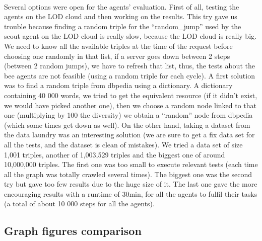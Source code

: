 \documentclass{article}
\begin{document}
		\paragraph{}
			Several options were open for the agents' evaluation.
			First of all, testing the agents on the LOD cloud and then working on the results.
			This try gave us trouble because finding a random triple for the ``random\_jump'' used by the scout agent
			on the LOD cloud is really slow, because the LOD cloud is really big.
			We need to know all the available triples at the time of the request before choosing one randomly in that list,
			if a server goes down between 2 steps (between 2 random jumps), we have to refresh that list,
			thus, the tests about the bee agents are not feasible (using a random triple for each cycle).
			A first solution was to find a random triple from dbpedia using a dictionary.
			A dictionary containing 40 000 words, we tried to get the equivalent resource
			(if it didn't exist, we would have picked another one),
			then we choose a random node linked to that one (multiplying by 100 the diversity) we obtain a ``random'' node from dbpedia
			(which some times get down as well).
			On the other hand, taking a dataset from the data laundry was an interesting solution
			(we are sure to get a fix data set for all the tests, and the dataset is clean of mistakes).
			We tried a data set of size 1,001 triples, another of 1,003,529 triples and the biggest one of around 10,000,000 triples.
			The first one was too small to execute relevant tests (each time all the graph was totally crawled several times).
			The biggest one was the second try but gave too few results due to the huge size of it.
			The last one gave the more encouraging results with a runtime of 30min, for all the agents to fulfil their tasks
			(a total of about 10 000 steps for all the agents).
	\subsection{Graph figures comparison}
\end{document}
